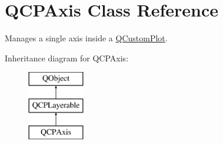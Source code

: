 \hypertarget{class_q_c_p_axis}{}\section{Q\+C\+P\+Axis Class Reference}
\label{class_q_c_p_axis}


Manages a single axis inside a \mbox{\hyperlink{class_q_custom_plot}{Q\+Custom\+Plot}}.  


Inheritance diagram for Q\+C\+P\+Axis\+:\begin{figure}[H]
\begin{center}
\leavevmode
\includegraphics[height=3.000000cm]{class_q_c_p_axis}
\end{center}
\end{figure}
